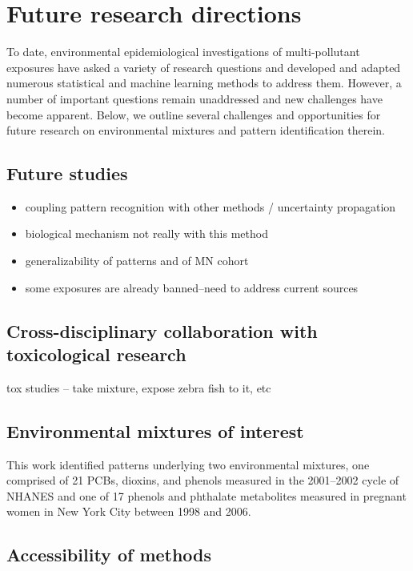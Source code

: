 \clearpage
\section{Future research directions}\label{sec:future}
To date, environmental epidemiological investigations of multi-pollutant exposures have asked a variety of research questions and developed and adapted numerous statistical and machine learning methods to address them. However, a number of important questions remain unaddressed and new challenges have become apparent. Below, we outline several challenges and opportunities for future research on environmental mixtures and pattern identification therein.

\subsection{Future studies}

\begin{itemize}
    \item coupling pattern recognition with other methods / uncertainty propagation
    \item biological mechanism not really with this method
    \item generalizability of patterns and of MN cohort
    \item some exposures are already banned--need to address current sources
\end{itemize}

\subsection{Cross-disciplinary collaboration with toxicological research}

tox studies -- take mixture, expose zebra fish to it, etc

\subsection{Environmental mixtures of interest}
This work identified patterns underlying two environmental mixtures, one comprised of 21 PCBs, dioxins, and phenols measured in the 2001--2002 cycle of NHANES and one of 17 phenols and phthalate metabolites measured in pregnant women in New York City between 1998 and 2006.

\subsection{Accessibility of methods}

